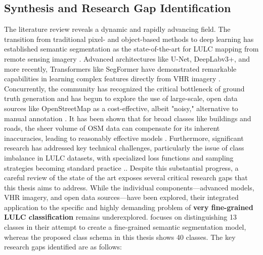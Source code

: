 \documentclass{report}
\begin{document}
\subsection{Synthesis and Research Gap Identification}
The literature review reveals a dynamic and rapidly advancing field. The transition from traditional pixel- and object-based methods to deep learning has established semantic segmentation as the state-of-the-art for LULC mapping from remote sensing imagery \parencite[p.~311f.]{KotaridisLazaridouRemotesensingimagesegmentationadvancesmetaanalysis2021a}. Advanced architectures like U-Net, DeepLabv3+, and more recently, Transformers like SegFormer have demonstrated remarkable capabilities in learning complex features directly from VHR imagery \parencite[p.~178ff.]{LuoEtAlSemanticsegmentationagriculturalimagessurvey2024}. Concurrently, the community has recognized the critical bottleneck of ground truth generation and has begun to explore the use of large-scale, open data sources like OpenStreetMap as a cost-effective, albeit "noisy," alternative to manual annotation \parencite[p.~1]{KaiserEtAlLearningAerialImageSegmentationOnlineMaps2017}. It has been shown that for broad classes like buildings and roads, the sheer volume of OSM data can compensate for its inherent inaccuracies, leading to reasonably effective models \parencite[p.~2]{KaiserEtAlLearningAerialImageSegmentationOnlineMaps2017}. Furthermore, significant research has addressed key technical challenges, particularly the issue of class imbalance in LULC datasets, with specialized loss functions and sampling strategies becoming standard practice \parencites[p.~7934f.;]{BhatEtAlRobustlossfunctionclassimbalancedsemanticsegmentationimageclassification2023a}[p.~8.]{SertelEtAlLandUseLandCoverMappingUsingDeepLearningBasedSegmentationApproachesVHRWorldview3Images2022}..
Despite this substantial progress, a careful review of the state of the art exposes several critical research gaps that this thesis aims to address. While the individual components—advanced models, VHR imagery, and open data sources—have been explored, their integrated application to the specific and highly demanding problem of \textbf{very fine-grained LULC classification} remains underexplored. \parencite[p.~11f.]{SertelEtAlLandUseLandCoverMappingUsingDeepLearningBasedSegmentationApproachesVHRWorldview3Images2022} focuses on distinguishing 13 classes in their attempt to create a fine-grained semantic segmentation model, whereas the proposed class schema in this thesis shows 40 classes.
The key research gaps identified are as follows:
\end{document}
